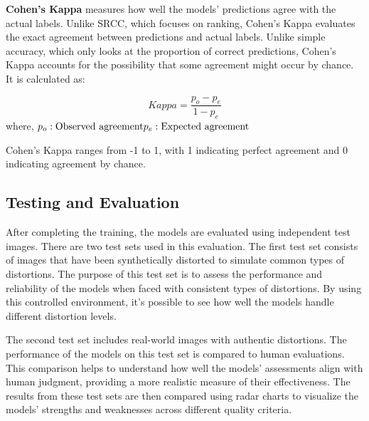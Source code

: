 \noindent
\textbf{Cohen’s Kappa} measures how well the models’ predictions agree with the actual labels. Unlike SRCC, which focuses on ranking, Cohen’s Kappa evaluates the exact agreement between predictions and actual labels. Unlike simple accuracy, which only looks at the proportion of correct predictions, Cohen’s Kappa accounts for the possibility that some agreement might occur by chance. It is calculated as: \par
\begin{equation}
    Kappa = \frac{p_o - p_e}{1 - p_e}
\end{equation}
\noindent
where, \newline
$p_o: \text{Observed agreement} \\ p_e: \text{Expected agreement}$ \par
\vspace{\baselineskip}
\noindent
Cohen’s Kappa ranges from -1 to 1, with 1 indicating perfect agreement and 0 indicating agreement by chance. \par

\subsection{Testing and Evaluation}
\label{sub:TestExperiment}
After completing the training, the models are evaluated using independent test images. There are two test sets used in this evaluation. The first test set consists of images that have been synthetically distorted to simulate common types of distortions. The purpose of this test set is to assess the performance and reliability of the models when faced with consistent types of distortions. By using this controlled environment, it’s possible to see how well the models handle different distortion levels. \par 
\vspace{\baselineskip}
\noindent
The second test set includes real-world images with authentic distortions. The performance of the models on this test set is compared to human evaluations. This comparison helps to understand how well the models’ assessments align with human judgment, providing a more realistic measure of their effectiveness. The results from these test sets are then compared using radar charts to visualize the models’ strengths and weaknesses across different quality criteria. \par


